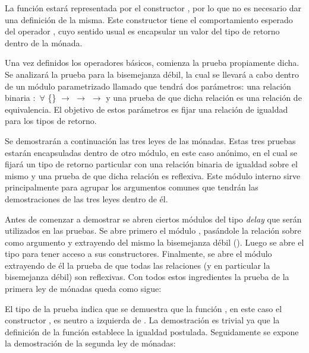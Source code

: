 La función  estará representada por el constructor , por lo que no es necesario dar una definición de la misma. Este constructor tiene el comportamiento esperado del operador , cuyo sentido usual es encapsular un valor del tipo de retorno dentro de la mónada.

Una vez definidos los operadores básicos, comienza la prueba propiamente dicha. Se analizará la prueba para la bisemejanza débil, la cual se llevará a cabo dentro de un módulo parametrizado llamado  que tendrá dos parámetros: una relación binaria \AgdaBound{$\_\sim\_$} $:$ $\forall$ \{\} $\rightarrow$  $\rightarrow$  $\rightarrow$  y una prueba de que dicha relación es una relación de equivalencia. El objetivo de estos parámetros es fijar una relación de igualdad para los tipos de retorno. 


Se demostrarán a continuación las tres leyes de las mónadas. Estas tres pruebas estarán encapsuladas dentro de otro módulo, en este caso anónimo, en el cual se fijará un tipo de retorno particular  con una relación binaria de igualdad sobre el mismo y una prueba de que dicha relación es reflexiva. Este módulo interno sirve principalmente para agrupar los argumentos comunes que tendrán las demostraciones de las tres leyes dentro de él. 


Antes de comenzar a demostrar se abren ciertos módulos del tipo \textit{delay} que serán utilizados en las pruebas. Se abre primero el módulo , pasándole la relación \AgdaBound{$\_\sim\_$} sobre  como argumento y extrayendo del mismo la bisemejanza débil (\AgdaFunction{$\_\approx\_$}). Luego se abre el tipo   para tener acceso a sus constructores. Finalmente, se abre el módulo  extrayendo de él la prueba  de que todas las relaciones (y en particular la bisemejanza débil) son reflexivas. Con todos estos ingredientes la prueba de la primera ley de mónadas queda como sigue:


El tipo de la prueba indica que se demuestra que la función , en este caso el constructor , es neutro a izquierda de . La demostración es trivial ya que la definición de la función  establece la igualdad postulada. Seguidamente se expone la demostración de la segunda ley de mónadas:

